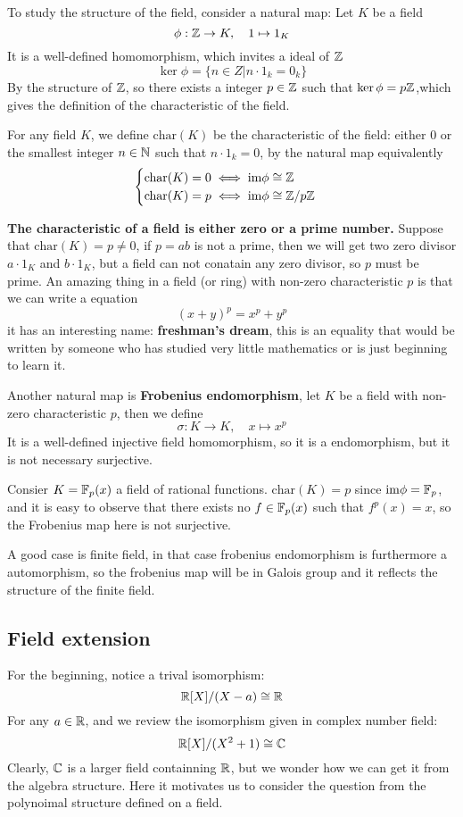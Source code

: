 \documentclass[en,geye,blue,normal,12pt]{elegantnote}
\begin{document}
To study the structure of the field, consider a natural map: Let \(K\) be a field
\[\phi: \mathbb{Z} \to K, \quad  1 \mapsto 1_K\]
It is a well-defined homomorphism, which invites a ideal of \(\mathbb{Z}\)
\[\ker \phi = \{n \in Z| n \cdot 1_k = 0_k\}\]
By the structure of \(\mathbb{Z}\), so there exists a integer \(p \in \mathbb{Z}\) such that \(\ker \phi = p \mathbb{Z}\),which gives the definition of the characteristic of the field.
\begin{definition}
  For any field \(K\), we define \(\mathrm{char}(K)\) be the characteristic of the field: either 0 or the smallest integer \(n \in \mathbb{N}\) such that \(n\cdot1_k = 0\), by the natural map equivalently
  \[\begin{cases}
    \mathrm{char}(K) = 0 \iff  \mathrm{im}\phi \cong \mathbb{Z} \\
    \mathrm{char}(K) = p \iff  \mathrm{im}\phi \cong \mathbb{Z}/p\mathbb{Z}
  \end{cases}\]
\end{definition}
\textbf{The characteristic of a field is either zero or a prime number.} Suppose that \(\mathrm{char}(K) = p \neq 0\), if \(p =ab\) is not a prime, then we will get two zero divisor \(a\cdot1_K\) and \(b\cdot1_K\), but a field can not conatain any zero divisor, so \(p\) must be prime. An amazing thing in a field (or ring) with non-zero characteristic \(p\) is that we can write a equation
\[(x+y)^p = x^p + y^p\]
it has an interesting name: \textbf{freshman's dream}, this is an equality that would be written by someone who has studied very little mathematics or is just beginning to learn it.

Another natural map is \textbf{Frobenius endomorphism}, let \(K\) be a field with non-zero characteristic \(p\), then we define 
\[\sigma: K \to K, \quad x \mapsto x^p\]
It is a well-defined injective field homomorphism, so it is a endomorphism, but it is not necessary surjective.

\begin{example}
  Consier \(K = \mathbb{F}_p(x)\) a field of rational functions. \(\mathrm{char}(K) = p\) since \(\mathrm{im} \phi = \mathbb{F}_p\), and it is easy to observe that there exists no \(f \in \mathbb{F}_p(x)\) such that \(f^p(x) = x\), so the Frobenius map here is not surjective. 
\end{example}
A good case is finite field, in that case frobenius endomorphism is furthermore a automorphism, so the frobenius map will be in Galois group and it reflects the structure of the finite field.

\subsection{Field extension}
For the beginning, notice a trival isomorphism:
\[\mathbb{R}[X]/(X-a) \cong \mathbb{R} \]
For any \(a \in \mathbb{R}\), and we review the isomorphism given in complex number field:
\[ \mathbb{R}[X]/ (X^2+1) \cong \mathbb{C}\]
Clearly, \(\mathbb{C}\) is a larger field containning \(\mathbb{R}\), but we wonder how we can get it from the algebra structure. Here it motivates us to consider the question from the polynoimal structure defined on a field.
\end{document}
